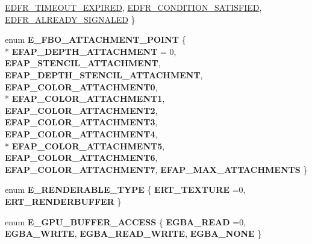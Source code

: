 \begin{DoxyCompactItemize}
\hyperlink{namespaceirr_1_1video_ae93020af22218bae203c7bb52b87590baf382ae8cccf90ec082f8737cb341159a}{E\+D\+F\+R\+\_\+\+T\+I\+M\+E\+O\+U\+T\+\_\+\+E\+X\+P\+I\+R\+ED}, 
\hyperlink{namespaceirr_1_1video_ae93020af22218bae203c7bb52b87590baece86f2df05046a215ccf9e4ec99f22d}{E\+D\+F\+R\+\_\+\+C\+O\+N\+D\+I\+T\+I\+O\+N\+\_\+\+S\+A\+T\+I\+S\+F\+I\+ED}, 
\hyperlink{namespaceirr_1_1video_ae93020af22218bae203c7bb52b87590ba9c2bd52f326df5e621b74f8bb2b2dd7f}{E\+D\+F\+R\+\_\+\+A\+L\+R\+E\+A\+D\+Y\+\_\+\+S\+I\+G\+N\+A\+L\+ED}
 \}
\item 
enum {\bfseries E\+\_\+\+F\+B\+O\+\_\+\+A\+T\+T\+A\+C\+H\+M\+E\+N\+T\+\_\+\+P\+O\+I\+NT} \{ \\*
{\bfseries E\+F\+A\+P\+\_\+\+D\+E\+P\+T\+H\+\_\+\+A\+T\+T\+A\+C\+H\+M\+E\+NT} = 0, 
{\bfseries E\+F\+A\+P\+\_\+\+S\+T\+E\+N\+C\+I\+L\+\_\+\+A\+T\+T\+A\+C\+H\+M\+E\+NT}, 
{\bfseries E\+F\+A\+P\+\_\+\+D\+E\+P\+T\+H\+\_\+\+S\+T\+E\+N\+C\+I\+L\+\_\+\+A\+T\+T\+A\+C\+H\+M\+E\+NT}, 
{\bfseries E\+F\+A\+P\+\_\+\+C\+O\+L\+O\+R\+\_\+\+A\+T\+T\+A\+C\+H\+M\+E\+N\+T0}, 
\\*
{\bfseries E\+F\+A\+P\+\_\+\+C\+O\+L\+O\+R\+\_\+\+A\+T\+T\+A\+C\+H\+M\+E\+N\+T1}, 
{\bfseries E\+F\+A\+P\+\_\+\+C\+O\+L\+O\+R\+\_\+\+A\+T\+T\+A\+C\+H\+M\+E\+N\+T2}, 
{\bfseries E\+F\+A\+P\+\_\+\+C\+O\+L\+O\+R\+\_\+\+A\+T\+T\+A\+C\+H\+M\+E\+N\+T3}, 
{\bfseries E\+F\+A\+P\+\_\+\+C\+O\+L\+O\+R\+\_\+\+A\+T\+T\+A\+C\+H\+M\+E\+N\+T4}, 
\\*
{\bfseries E\+F\+A\+P\+\_\+\+C\+O\+L\+O\+R\+\_\+\+A\+T\+T\+A\+C\+H\+M\+E\+N\+T5}, 
{\bfseries E\+F\+A\+P\+\_\+\+C\+O\+L\+O\+R\+\_\+\+A\+T\+T\+A\+C\+H\+M\+E\+N\+T6}, 
{\bfseries E\+F\+A\+P\+\_\+\+C\+O\+L\+O\+R\+\_\+\+A\+T\+T\+A\+C\+H\+M\+E\+N\+T7}, 
{\bfseries E\+F\+A\+P\+\_\+\+M\+A\+X\+\_\+\+A\+T\+T\+A\+C\+H\+M\+E\+N\+TS}
 \}\hypertarget{namespaceirr_1_1video_a1876a4fa2464da23fc1966a40e0c8e85}{}\label{namespaceirr_1_1video_a1876a4fa2464da23fc1966a40e0c8e85}

\item 
enum {\bfseries E\+\_\+\+R\+E\+N\+D\+E\+R\+A\+B\+L\+E\+\_\+\+T\+Y\+PE} \{ {\bfseries E\+R\+T\+\_\+\+T\+E\+X\+T\+U\+RE} =0, 
{\bfseries E\+R\+T\+\_\+\+R\+E\+N\+D\+E\+R\+B\+U\+F\+F\+ER}
 \}\hypertarget{namespaceirr_1_1video_a62205a255b41650afcbe24bacdfcaead}{}\label{namespaceirr_1_1video_a62205a255b41650afcbe24bacdfcaead}

\item 
enum {\bfseries E\+\_\+\+G\+P\+U\+\_\+\+B\+U\+F\+F\+E\+R\+\_\+\+A\+C\+C\+E\+SS} \{ {\bfseries E\+G\+B\+A\+\_\+\+R\+E\+AD} =0, 
{\bfseries E\+G\+B\+A\+\_\+\+W\+R\+I\+TE}, 
{\bfseries E\+G\+B\+A\+\_\+\+R\+E\+A\+D\+\_\+\+W\+R\+I\+TE}, 
{\bfseries E\+G\+B\+A\+\_\+\+N\+O\+NE}
 \}\hypertarget{namespaceirr_1_1video_a895e0d2b1558de3a6e7d78679987fd39}{}\label{namespaceirr_1_1video_a895e0d2b1558de3a6e7d78679987fd39}


\end{DoxyCompactItemize}

